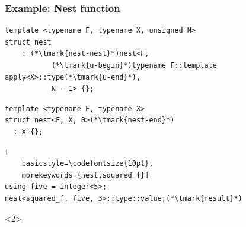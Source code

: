 \documentclass[14pt]{beamer}
\begin{document}
\begin{frame}[fragile]
  \frametitle{Example: Nest function}
  
  \begin{lstlisting}[basicstyle=\codefontsize{10pt}]
template <typename F, typename X, unsigned N>
struct nest
    : (*\tmark{nest-nest}*)nest<F,
           (*\tmark{u-begin}*)typename F::template apply<X>::type(*\tmark{u-end}*),
           N - 1> {};
  \end{lstlisting}

  \vspace{.25cm}

  \begin{lstlisting}[basicstyle=\codefontsize{10pt}]
template <typename F, typename X>
struct nest<F, X, 0>(*\tmark{nest-end}*)
  : X {};
  \end{lstlisting}

  \vspace{.25cm}

  \begin{lstlisting}[
    basicstyle=\codefontsize{10pt},
    morekeywords={nest,squared_f}]
using five = integer<5>;
nest<squared_f, five, 3>::type::value;(*\tmark{result}*)
  \end{lstlisting}

  \begin{onlyenv}<2>
    \nointerlineskip
  \end{onlyenv}

\end{frame}
\end{document}
